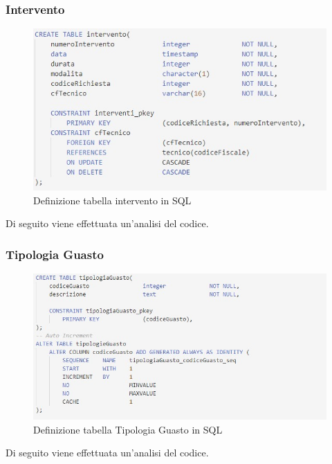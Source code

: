 \documentclass[legalpaper]{article}
\begin{document}
	\subsubsection{Intervento}
		\begin{figure}[h]
			\centering
			\includegraphics[width=0.9\linewidth]{Immagini SQL/intervento}
			\caption{Definizione tabella intervento in SQL}
			\label{interventosql}
		\end{figure}
		Di seguito viene effettuata un'analisi del codice. \\

	\subsubsection{Tipologia Guasto}
		\begin{figure}[h]
			\centering
			\includegraphics[width=0.9\linewidth]{Immagini SQL/tipologiaGuasto}
			\caption{Definizione tabella Tipologia Guasto in SQL}
			\label{tipologiaGuastosql}
		\end{figure}
		Di seguito viene effettuata un'analisi del codice. \\
\newpage
\end{document}
